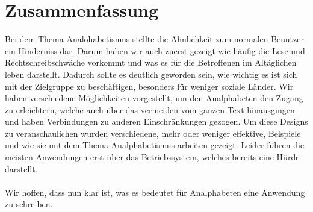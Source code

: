 \section{Zusammenfassung}
Bei dem Thema Analohabetismus stellte die Ähnlichkeit zum normalen Benutzer ein Hinderniss dar.
Darum haben wir auch zuerst gezeigt wie häufig die Lese und Rechtschreibschwäche vorkommt und was es für die Betroffenen im Altäglichen leben darstellt. Dadurch sollte es deutlich geworden sein, wie wichtig es ist sich mit der Zielgruppe zu beschäftigen, besonders für weniger soziale Länder. Wir haben verschiedene Möglichkeiten vorgestellt, um den Analphabeten den Zugang zu erleichtern, welche auch über das vermeiden vom ganzen Text hinausgingen und haben Verbindungen zu anderen Einschränkungen gezogen. Um diese Designs zu veranschaulichen wurden verschiedene, mehr oder weniger effektive, Beispiele und wie sie mit dem Thema Analphabetismus arbeiten gezeigt. Leider führen die meisten Anwendungen erst über das Betriebssystem, welches bereits eine Hürde darstellt.\\\\
Wir hoffen, dass nun klar ist, was es bedeutet für Analphabeten eine Anwendung zu schreiben.